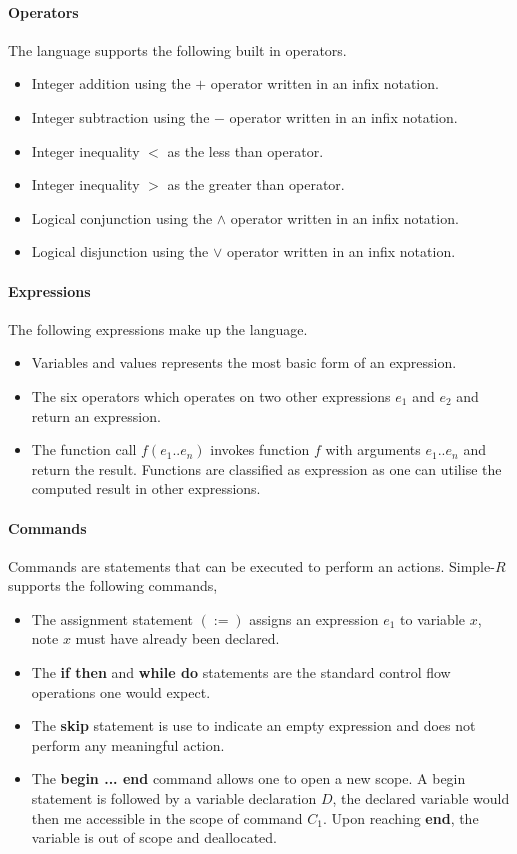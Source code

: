 \documentclass[a4paper,12pt]{report}
\begin{document}
\paragraph{Operators}
The language supports the following built in operators.
\begin{itemize}
  \item Integer addition using the $+$ operator written in an infix notation.
  \item Integer subtraction using the $-$ operator written in an infix notation.
  \item Integer inequality $<$ as the less than operator.
  \item Integer inequality $>$ as the greater than operator.
  \item Logical conjunction using the $\wedge$ operator written in an infix 
  notation.
  \item Logical disjunction using the $\vee$ operator written in an infix 
  notation.
\end{itemize}

\paragraph{Expressions} The following expressions make up the language.
\begin{itemize}
  \item Variables and values represents the most basic form of an expression.
  \item The six operators which operates on two other expressions $e_1$ 
  and $e_2$ and return an expression.
  \item The function call $f(e_1..e_n)$ invokes function $f$ with arguments 
  $e_1..e_n$ and return the result. Functions are classified as expression as 
  one can utilise the computed result in other expressions. 
\end{itemize}

\paragraph{Commands} Commands are statements that can be executed to perform an 
actions. Simple-$R$ supports the following commands,
\begin{itemize}
  \item The assignment statement $(:=)$ assigns an expression $e_1$ to variable 
  $x$, note $x$ must have already been declared. 
  \item The \textbf{if then} and \textbf{while do} statements are the standard 
  control flow operations one would expect.
  \item The \textbf{skip} statement is use to indicate an empty expression and 
  does not perform any meaningful action. 
  \item The \textbf{begin ... end} command allows one to open a new scope. A 
  begin statement is followed by a variable declaration $D$, the declared 
  variable would then me accessible in the scope of command $C_1$. Upon reaching 
  \textbf{end}, the variable is out of scope and deallocated. 
\end{itemize}
\end{document}
